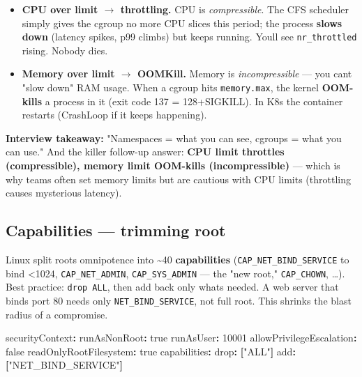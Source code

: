 \documentclass[11pt]{article}
\providecommand{\tightlist}{\setlength{\itemsep}{1pt}\setlength{\parskip}{0pt}}
\newenvironment{Shaded}{\begin{snugshade}}{\end{snugshade}}
\newcommand{\AttributeTok}[1]{\textcolor[rgb]{0.16,0.50,0.73}{#1}}
\newcommand{\CharTok}[1]{\textcolor[rgb]{0.24,0.68,0.91}{#1}}
\newcommand{\DecValTok}[1]{\textcolor[rgb]{0.96,0.45,0.00}{#1}}
\newcommand{\FunctionTok}[1]{\textcolor[rgb]{0.56,0.27,0.68}{#1}}
\newcommand{\KeywordTok}[1]{\textcolor[rgb]{0.81,0.81,0.76}{\textbf{#1}}}
\newcommand{\StringTok}[1]{\textcolor[rgb]{0.96,0.31,0.31}{#1}}
\begin{document}
\begin{itemize}
\tightlist
\item
  \textbf{CPU over limit \(\rightarrow\) throttling.} CPU is \emph{compressible}. The CFS scheduler simply gives the cgroup no more CPU slices this period; the process \textbf{slows down} (latency spikes, p99 climbs) but keeps running. You\textquotesingle ll see \texttt{nr\_throttled} rising. Nobody dies.
\item
  \textbf{Memory over limit \(\rightarrow\) OOMKill.} Memory is \emph{incompressible} --- you can\textquotesingle t "slow down" RAM usage. When a cgroup hits \texttt{memory.max}, the kernel \textbf{OOM-kills} a process in it (exit code 137 = 128+SIGKILL). In K8s the container restarts (CrashLoop if it keeps happening).
\end{itemize}

\textbf{Interview takeaway:} "Namespaces = what you can see, cgroups = what you can use." And the killer follow-up answer: \textbf{CPU limit throttles (compressible), memory limit OOM-kills (incompressible)} --- which is why teams often set memory limits but are cautious with CPU limits (throttling causes mysterious latency).

\subsection{Capabilities --- trimming root}\label{capabilities--trimming-root}

Linux split root\textquotesingle s omnipotence into \textasciitilde40 \textbf{capabilities} (\texttt{CAP\_NET\_BIND\_SERVICE} to bind \textless1024, \texttt{CAP\_NET\_ADMIN}, \texttt{CAP\_SYS\_ADMIN} --- the "new root," \texttt{CAP\_CHOWN}, \ldots). Best practice: \texttt{drop\ ALL}, then add back only what\textquotesingle s needed. A web server that binds port 80 needs only \texttt{NET\_BIND\_SERVICE}, not full root. This shrinks the blast radius of a compromise.


\begin{Shaded}
\begin{Highlighting}[]
\FunctionTok{securityContext}\KeywordTok{:}
\AttributeTok{  }\FunctionTok{runAsNonRoot}\KeywordTok{:}\AttributeTok{ }\CharTok{true}
\AttributeTok{  }\FunctionTok{runAsUser}\KeywordTok{:}\AttributeTok{ }\DecValTok{10001}
\AttributeTok{  }\FunctionTok{allowPrivilegeEscalation}\KeywordTok{:}\AttributeTok{ }\CharTok{false}
\AttributeTok{  }\FunctionTok{readOnlyRootFilesystem}\KeywordTok{:}\AttributeTok{ }\CharTok{true}
\AttributeTok{  }\FunctionTok{capabilities}\KeywordTok{:}
\AttributeTok{    }\FunctionTok{drop}\KeywordTok{:}\AttributeTok{ }\KeywordTok{[}\StringTok{"ALL"}\KeywordTok{]}
\AttributeTok{    }\FunctionTok{add}\KeywordTok{:}\AttributeTok{ }\KeywordTok{[}\StringTok{"NET\_BIND\_SERVICE"}\KeywordTok{]}
\end{Highlighting}
\end{Shaded}
\end{document}
